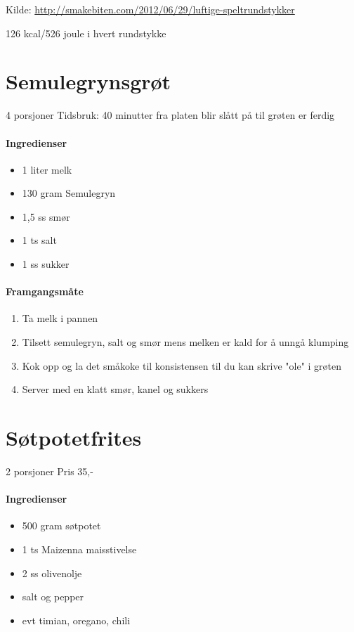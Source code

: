 \documentclass[12pt,a4paper]{book}
\begin{document}
{Kilde: \url{http://smakebiten.com/2012/06/29/luftige-speltrundstykker}


126 kcal/526 joule i hvert rundstykke
\clearpage{}
\clearpage{}\section{﻿Semulegrynsgrøt}
4 porsjoner
Tidsbruk: 40 minutter fra platen blir slått på til grøten er  ferdig

\paragraph{Ingredienser}
\begin{itemize}[noitemsep]
	\item 1 liter melk
	\item 130 gram Semulegryn
	\item 1,5 ss smør
	\item 1 ts salt
	\item 1 ss sukker
\end{itemize}

\paragraph{Framgangsmåte}
\begin{enumerate}[noitemsep]
	\item Ta melk i pannen
	\item Tilsett semulegryn, salt og smør mens melken er kald for å unngå klumping
	\item Kok opp og la det småkoke til konsistensen til du kan skrive "ole" i grøten
	\item Server med en klatt smør, kanel og sukkers
\end{enumerate}
\clearpage{}
\clearpage{}\section{﻿Søtpotetfrites}
\label{frites}

2 porsjoner
Pris 35,-

\paragraph{Ingredienser}
\begin{itemize}[noitemsep]
	\item 500 gram søtpotet
	\item 1 ts Maizenna maisstivelse
	\item 2 ss olivenolje
	\item salt og pepper
	\item evt timian, oregano, chili
\end{itemize}

}
\end{document}
